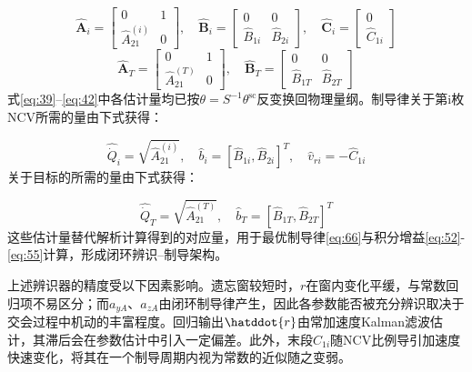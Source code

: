 \begin{equation}
\label{eq:39}
\hat{\mathbf{A}}_{i} = \left[ {\begin{array}{*{20}{c}}
  0&1 \\ 
  {\hat A_{21}^{(i)}}&0 
\end{array}} \right],\quad \hat{\mathbf{B}}_{i} = \left[ {\begin{array}{*{20}{c}}
  0&0 \\ 
  {{{\hat B}_{1i}}}&{{{\hat B}_{2i}}} 
\end{array}} \right],\quad \hat{\mathbf{C}}_{i} = \left[ {\begin{array}{*{20}{c}}
  0 \\ 
  {{{\hat C}_{1i}}} 
\end{array}} \right]
\end{equation}
\begin{equation}
\label{eq:40}
\hat{\mathbf{A}}_{T} = \left[ {\begin{array}{*{20}{c}}
  0&1 \\ 
  {\hat A_{21}^{(T)}}&0 
\end{array}} \right],\quad \hat{\mathbf{B}}_{T} = \left[ {\begin{array}{*{20}{c}}
  0&0 \\ 
  {{{\hat B}_{1T}}}&{{{\hat B}_{2T}}} 
\end{array}} \right]
\end{equation}
式\eqref{eq:39}--\eqref{eq:42}中各估计量均已按$\theta  = {S^{ - 1}}{\theta ^{{\text{sc}}}}$反变换回物理量纲。制导律关于第i枚NCV所需的量由下式获得：

\begin{equation}
\label{eq:41}
\hat{\dot Q}_{i} = \sqrt {\hat A_{21}^{(i)}} ,\quad \hat{b}_{i} = {\left[ {{{\hat B}_{1i}},{{\hat B}_{2i}}} \right]^T},\quad \hat{v}_{ri} =  - \hat{C}_{1i}
\end{equation}
关于目标的所需的量由下式获得：

\begin{equation}
\label{eq:42}
\hat{\dot Q}_{T} = \sqrt {\hat A_{21}^{(T)}} ,\quad \hat{b}_{T} = {\left[ {{{\hat B}_{1T}},{{\hat B}_{2T}}} \right]^T}
\end{equation}
这些估计量替代解析计算得到的对应量，用于最优制导律\eqref{eq:66}与积分增益\eqref{eq:52}-\eqref{eq:55}计算，形成闭环辨识–制导架构。
\begin{remark}
上述辨识器的精度受以下因素影响。遗忘窗较短时，${r}$在窗内变化平缓，与常数回归项不易区分；而${a_{yA}}$、${a_{zA}}$由闭环制导律产生，因此各参数能否被充分辨识取决于交会过程中机动的丰富程度。回归输出$\hatddot{r}$由常加速度Kalman滤波估计，其滞后会在参数估计中引入一定偏差。此外，末段${C_{1i}}$随NCV比例导引加速度快速变化，将其在一个制导周期内视为常数的近似随之变弱。
\end{remark}

